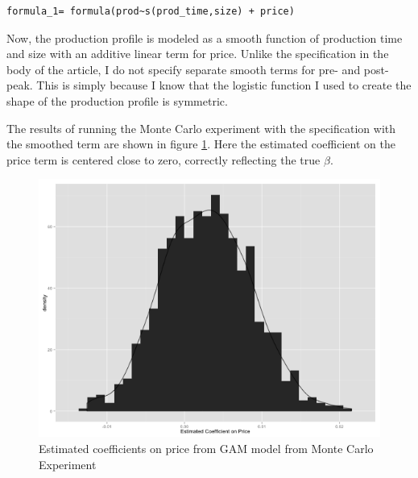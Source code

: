 \documentclass[12pt]{article}
\begin{document}
\begin{verbatim}
formula_1= formula(prod~s(prod_time,size) + price)
\end{verbatim}

Now, the production profile is modeled as a smooth function of production time and size with an additive linear term for price.  Unlike the specification in the body of the article, I do not specify separate smooth terms for pre- and post-peak.  This is simply because I know that the logistic function I used to create the shape of the production profile is symmetric.  

The results of running the Monte Carlo experiment with the specification with the smoothed term are shown in figure \ref{gam_model_price_mc.png}.  Here the estimated coefficient on the price term is centered close to zero, correctly reflecting the true $\beta$.

\begin{figure}
	\includegraphics[width=1\textwidth]{figures/gam_model_price_mc.png}
	\caption{Estimated coefficients on price from GAM model from Monte Carlo Experiment}
	\label{gam_model_price_mc.png}	
\end{figure}

\FloatBarrier



\end{document}
